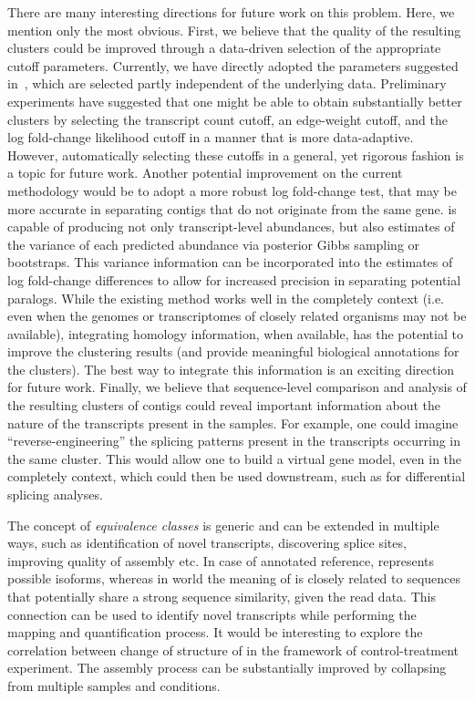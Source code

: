 There are many interesting directions for future work on this problem. Here, we mention only the most obvious. First, we believe that the quality of the resulting clusters could be improved through a data-driven selection of the appropriate cutoff parameters.  Currently, we have directly adopted the parameters suggested in~\citep{corset}, which are selected partly independent of the underlying data.  Preliminary experiments have suggested that one might be able to obtain substantially better clusters by selecting the transcript count cutoff, an edge-weight cutoff, and the log fold-change likelihood cutoff in a manner that is more data-adaptive.  However, automatically selecting these cutoffs in a general, yet rigorous fashion is a topic for future work.  Another potential improvement on the current methodology would be to adopt a more robust log fold-change test, that may be more accurate in separating contigs that do not originate from the same gene. \sailfish is capable of producing not only transcript-level abundances, but also estimates of the variance of each predicted abundance via posterior Gibbs sampling or bootstraps.  This variance information can be incorporated into the estimates of log fold-change differences to allow for increased precision in separating potential paralogs. While the existing method works well in the completely \denovo context (i.e. even when the genomes or transcriptomes of closely related organisms may not be available), integrating homology information, when available, has the potential to improve the clustering results (and provide meaningful biological annotations for the clusters). The best way to integrate this information is an exciting direction for future work. Finally, we believe that sequence-level comparison and analysis of the resulting clusters of contigs could reveal important information about the nature of the transcripts present in the samples.  For example, one could imagine ``reverse-engineering'' the splicing patterns present in the transcripts occurring in the same cluster.  This would allow one to build a virtual gene model, even in the completely \denovo context, which could then be used downstream, such as for differential splicing analyses. 


The concept of {\it equivalence classes} is generic and can be extended in multiple ways, such as identification of novel transcripts, discovering splice sites, improving quality of \denovo assembly etc. In case of annotated reference, \eq represents possible isoforms, whereas in \denovo world the meaning of \eq is closely related to sequences that potentially share a strong sequence similarity, given the read data. This connection can be used to identify novel transcripts while performing the mapping and quantification process. It would be interesting to explore the correlation between change of structure of \eq in the framework of control-treatment experiment. The \denovo assembly process can be substantially improved by collapsing \eq from multiple samples and conditions. 

